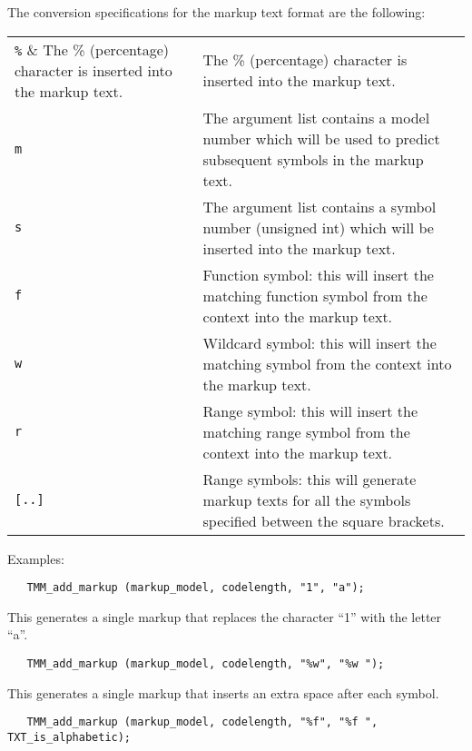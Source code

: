 \documentclass[11pt]{article}
\begin{document}
{\vspace{0.2cm}
The conversion specifications for the markup text format are the following:

\begin{tabular}{lp{12.8cm}}
\verb|%|    & The \% (percentage) character is inserted into the markup text. \\
\verb|m|    & The argument list contains a model number which will be used
              to predict subsequent symbols in the markup text. \\
\verb|s|    & The argument list contains a symbol number (unsigned int) which will be
	      inserted into the markup text. \\
\verb|f|    & Function symbol: this will insert the matching function symbol from the context into the
              markup text. \\
\verb|w|    & Wildcard symbol: this will insert the matching symbol from the context
              into the markup text. \\
\verb|r|    & Range symbol: this will insert the matching range symbol from the context into the
	      markup text. \\
\verb|[..]| & Range symbols: this will generate markup texts for all the symbols
              specified between the square brackets. \\
\end{tabular}

Examples:

\vspace{-0.2cm}
   \begin{verbatim}
   TMM_add_markup (markup_model, codelength, "1", "a");
   \end{verbatim}

\vspace{-0.6cm}
   This generates a single markup that replaces the character ``1'' with the letter ``a''.

   \begin{verbatim}
   TMM_add_markup (markup_model, codelength, "%w", "%w ");
   \end{verbatim}

\vspace{-0.6cm}
   This generates a single markup that inserts an extra space after each symbol.

   \begin{verbatim}
   TMM_add_markup (markup_model, codelength, "%f", "%f ", TXT_is_alphabetic);
   \end{verbatim}

}
\end{document}

